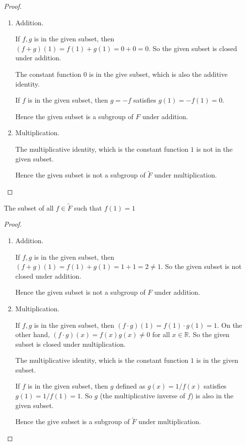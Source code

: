 \begin{proof}
    \begin{enumerate}[label={(\alph*)}]
        \item Addition.

              If $f, g$ is in the given subset, then $(f + g)(1) = f(1) + g(1) = 0 + 0 = 0$. So the given subset is closed under addition.

              The constant function $0$ is in the give subset, which is also the additive identity.

              If $f$ is in the given subset, then $g = -f$ satisfies $g(1) = -f(1) = 0$.

              Hence the given subset is a subgroup of $F$ under addition.
        \item Multiplication.

              The multiplicative identity, which is the constant function $1$ is not in the given subset.

              Hence the given subset is not a subgroup of $\tilde{F}$ under multiplication.
    \end{enumerate}
\end{proof}

\begin{exercise}
    The subset of all $f\in\tilde{F}$ such that $f(1) = 1$
\end{exercise}

\begin{proof}
    \begin{enumerate}[label={(\alph*)}]
        \item Addition.

              If $f, g$ is in the given subset, then $(f + g)(1) = f(1) + g(1) = 1 + 1 = 2\ne 1$. So the given subset is not closed under addition.

              Hence the given subset is not a subgroup of $F$ under addition.
        \item Multiplication.

              If $f, g$ is in the given subset, then $(f\cdot g)(1) = f(1)\cdot g(1) = 1$. On the other hand, $(f\cdot g)(x) = f(x)g(x) \ne 0$ for all $x\in\mathbb{R}$. So the given subset is closed under multiplication.

              The multiplicative identity, which is the constant function $1$ is in the given subset.

              If $f$ is in the given subset, then $g$ defined as $g(x) = 1/f(x)$ satisfies $g(1) = 1/f(1) = 1$. So $g$ (the multiplicative inverse of $f$) is also in the given subset.

              Hence the give subset is a subgroup of $\tilde{F}$ under multiplication.
    \end{enumerate}
\end{proof}

